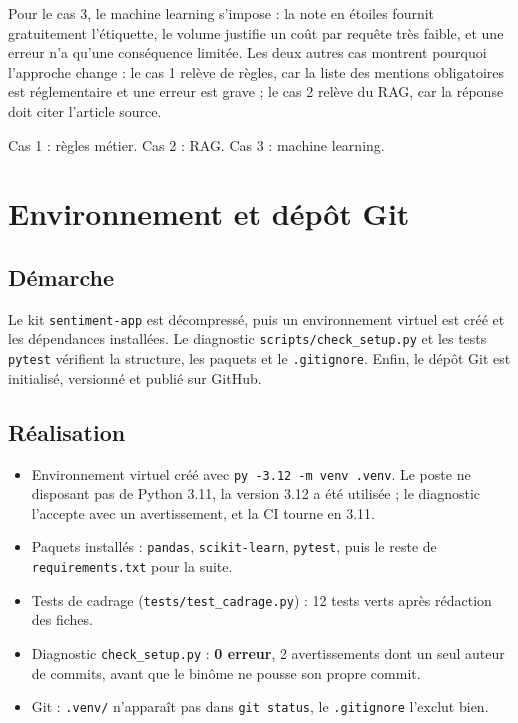 \documentclass[11pt,a4paper]{article}
\begin{document}
Pour le cas 3, le machine learning s'impose : la note en étoiles fournit gratuitement l'étiquette, le volume justifie un coût par requête très faible, et une erreur n'a qu'une conséquence limitée. Les deux autres cas montrent pourquoi l'approche change : le cas 1 relève de règles, car la liste des mentions obligatoires est réglementaire et une erreur est grave ; le cas 2 relève du RAG, car la réponse doit citer l'article source.

\begin{reponse}
Cas 1 : règles métier. Cas 2 : RAG. Cas 3 : machine learning.
\end{reponse}

\section{Environnement et dépôt Git}

\subsection{Démarche}

Le kit \texttt{sentiment-app} est décompressé, puis un environnement virtuel est créé et les dépendances installées. Le diagnostic \texttt{scripts/check\_setup.py} et les tests \texttt{pytest} vérifient la structure, les paquets et le \texttt{.gitignore}. Enfin, le dépôt Git est initialisé, versionné et publié sur GitHub.

\subsection{Réalisation}

\begin{itemize}[leftmargin=*]
  \item Environnement virtuel créé avec \texttt{py -3.12 -m venv .venv}. Le poste ne disposant pas de Python 3.11, la version 3.12 a été utilisée ; le diagnostic l'accepte avec un avertissement, et la CI tourne en 3.11.
  \item Paquets installés : \texttt{pandas}, \texttt{scikit-learn}, \texttt{pytest}, puis le reste de \texttt{requirements.txt} pour la suite.
  \item Tests de cadrage (\texttt{tests/test\_cadrage.py}) : 12 tests verts après rédaction des fiches.
  \item Diagnostic \texttt{check\_setup.py} : \textbf{0 erreur}, 2 avertissements dont un seul auteur de commits, avant que le binôme ne pousse son propre commit.
  \item Git : \texttt{.venv/} n'apparaît pas dans \texttt{git status}, le \texttt{.gitignore} l'exclut bien.
\end{itemize}
\end{document}
